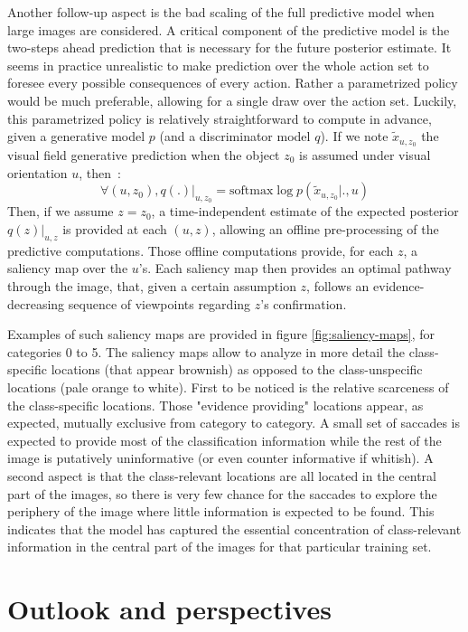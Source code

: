 \documentclass{article} %
\begin{document}
Another follow-up aspect is the bad scaling of the full predictive model when large images are considered. A critical component of the predictive model is the two-steps ahead prediction that is necessary for the future posterior estimate. It seems in practice unrealistic to make prediction over the whole action set to foresee every possible consequences of every action. Rather a parametrized policy would be much preferable, allowing for a single draw over the action set.
Luckily, this parametrized policy is relatively straightforward to compute in advance, given a generative model $p$ (and a discriminator model $q$). If we note $\tilde{x}_{u,z_0}$ the visual field generative prediction when the object $z_0$ is assumed under visual orientation $u$, then~:
$$\forall (u, z_0), q(.)|_{u, z_0} = \text{softmax} \log p(\tilde{x}_{u, z_0}|.,u)$$
Then, if we assume $z = z_0$, a time-independent estimate of the expected posterior $q(z)|_{u, z}$ is provided at each $(u, z)$, allowing an offline pre-processing of the predictive computations. Those offline computations provide, for each $z$, a saliency map over the $u$'s. Each saliency map then provides an optimal pathway through the image, that, given a certain assumption $z$, follows an evidence-decreasing sequence of viewpoints regarding $z$'s confirmation.  

Examples of such saliency maps are provided in figure \ref{fig:saliency-maps}, for categories 0 to 5. The saliency maps allow to analyze in more detail the class-specific locations (that appear brownish) as opposed to the class-unspecific locations (pale orange to white). First to be noticed is the relative scarceness of the class-specific locations. Those "evidence providing" locations appear, as expected, mutually exclusive from category to category. A small set of saccades is expected to provide most of the classification information while the rest of the image is putatively uninformative (or even counter informative if whitish). A second aspect is that the class-relevant locations are all located in the central part of the images, so there is very few chance for the saccades to explore the periphery of the image where little information is expected to be found. This indicates that the model has captured the essential concentration of class-relevant information in the central part of the images for that particular training set.

\section{Outlook and perspectives}
\end{document}

